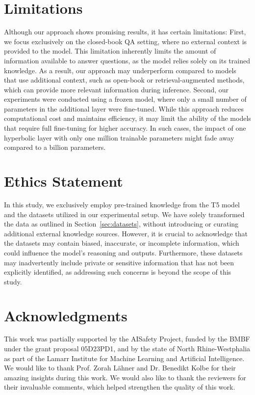 \documentclass[11pt]{article}
\begin{document}
\section{Limitations}
Although our approach shows promising results, it has certain limitations: 
First, we focus exclusively on the closed-book QA setting, where no external context is provided to the model. This limitation inherently limits the amount of information available to answer questions, as the model relies solely on its trained knowledge. As a result, our approach may underperform compared to models that use additional context, such as open-book \cite{jiang2022understanding, feng2020scalable, xu2021exploiting} or retrieval-augmented \cite{yucheng-etal-2024, shi-etal-2024-generate, zhang2024hierarchical} methods, which can provide more relevant information during inference.
Second, our experiments were conducted using a frozen model, where only a small number of parameters in the additional layer were fine-tuned. While this approach reduces computational cost and maintains efficiency, it may limit the ability of the models that require full fine-tuning for higher accuracy. In such cases, the impact of one hyperbolic layer with only one million trainable parameters might fade away compared to a billion parameters.
\section{Ethics Statement}
In this study, we exclusively employ pre-trained knowledge from the T5 model and the datasets utilized in our experimental setup. We have solely transformed the data as outlined in Section~\ref{sec:datasets}, without introducing or curating additional external knowledge sources. However, it is crucial to acknowledge that the datasets may contain biased, inaccurate, or incomplete information, which could influence the model's reasoning and outputs. Furthermore, these datasets may inadvertently include private or sensitive information that has not been explicitly identified, as addressing such concerns is beyond the scope of this study.

\section*{Acknowledgments}
This work was partially supported by the AISafety Project, funded by the BMBF under the grant proposal 05D23PD1, and by the state of North Rhine-Westphalia as part of the Lamarr Institute for Machine Learning and Artificial Intelligence. 
We would like to thank Prof. Zorah Lähner and Dr. Benedikt Kolbe for their amazing insights during this work. We would also like to thank the reviewers for their invaluable comments, which helped strengthen the quality of this work.

\end{document}

